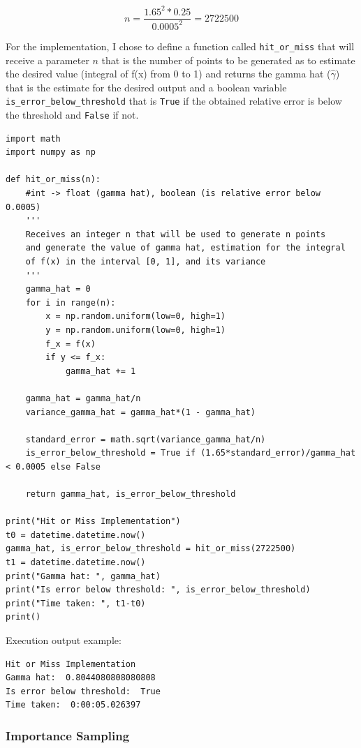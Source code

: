 \documentclass{homework}
\begin{document}
\begin{equation}
    n = \frac{1.65^2 * 0.25}{0.0005^2} = 2722500
\end{equation}

For the implementation, I chose to define a function called \verb|hit_or_miss| that will receive a parameter $n$ that is the number of points to be generated as to estimate the desired value (integral of f(x) from 0 to 1) and returns the gamma hat ($\hat \gamma$) that is the estimate for the desired output and a boolean variable \verb|is_error_below_threshold| that is \verb|True| if the obtained relative error is below the threshold and \verb|False| if not.

\begin{lstlisting}
import math
import numpy as np

def hit_or_miss(n):
	#int -> float (gamma hat), boolean (is relative error below 0.0005)
	'''
	Receives an integer n that will be used to generate n points
	and generate the value of gamma hat, estimation for the integral
	of f(x) in the interval [0, 1], and its variance
	'''
	gamma_hat = 0
	for i in range(n):
		x = np.random.uniform(low=0, high=1)
		y = np.random.uniform(low=0, high=1)
		f_x = f(x)
		if y <= f_x:
			gamma_hat += 1

	gamma_hat = gamma_hat/n
	variance_gamma_hat = gamma_hat*(1 - gamma_hat)

	standard_error = math.sqrt(variance_gamma_hat/n)
	is_error_below_threshold = True if (1.65*standard_error)/gamma_hat < 0.0005 else False

	return gamma_hat, is_error_below_threshold
	
print("Hit or Miss Implementation")
t0 = datetime.datetime.now()
gamma_hat, is_error_below_threshold = hit_or_miss(2722500)
t1 = datetime.datetime.now()
print("Gamma hat: ", gamma_hat)
print("Is error below threshold: ", is_error_below_threshold)
print("Time taken: ", t1-t0)
print()
\end{lstlisting}


Execution output example:
\begin{lstlisting}
Hit or Miss Implementation
Gamma hat:  0.8044080808080808
Is error below threshold:  True
Time taken:  0:00:05.026397
\end{lstlisting}









\subsubsection{Importance Sampling}
\end{document}
